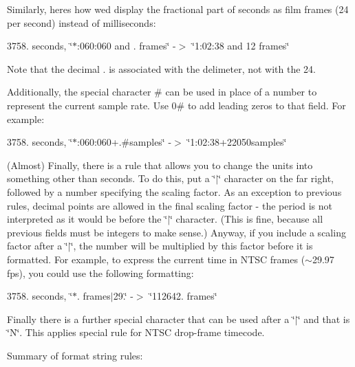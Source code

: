 Similarly, here\textquotesingle{}s how we\textquotesingle{}d display the fractional part of seconds as film frames (24 per second) instead of milliseconds\+:

3758. seconds, \char`\"{}$\ast$\+:060\+:060 and . frames\char`\"{} -\/$>$ \char`\"{}1\+:02\+:38 and 12 frames\char`\"{}

Note that the decimal \textquotesingle{}.\textquotesingle{} is associated with the delimeter, not with the 24.

Additionally, the special character \textquotesingle{}\#\textquotesingle{} can be used in place of a number to represent the current sample rate. Use \textquotesingle{}0\#\textquotesingle{} to add leading zeros to that field. For example\+:

3758. seconds, \char`\"{}$\ast$\+:060\+:060+.\#samples\char`\"{} -\/$>$ \char`\"{}1\+:02\+:38+22050samples\char`\"{}

(Almost) Finally, there is a rule that allows you to change the units into something other than seconds. To do this, put a \char`\"{}$\vert$\char`\"{} character on the far right, followed by a number specifying the scaling factor. As an exception to previous rules, decimal points are allowed in the final scaling factor -\/ the period is not interpreted as it would be before the \char`\"{}$\vert$\char`\"{} character. (This is fine, because all previous fields must be integers to make sense.) Anyway, if you include a scaling factor after a \char`\"{}$\vert$\char`\"{}, the number will be multiplied by this factor before it is formatted. For example, to express the current time in N\+T\+SC frames ($\sim$29.97 fps), you could use the following formatting\+:

3758. seconds, \char`\"{}$\ast$. frames$\vert$29.\char`\"{} -\/$>$ \char`\"{}112642. frames\char`\"{}

Finally there is a further special character that can be used after a \char`\"{}$\vert$\char`\"{} and that is \char`\"{}\+N\char`\"{}. This applies special rule for N\+T\+SC drop-\/frame timecode.

Summary of format string rules\+:


